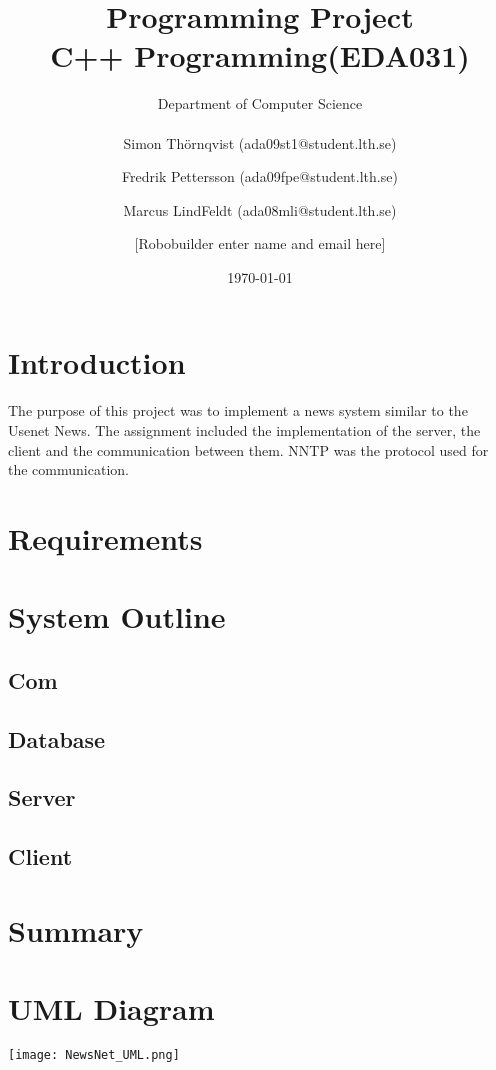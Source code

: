 \documentclass[a4paper, titlepage]{article}
\title{
    Programming Project \\
    C++ Programming(EDA031)
}
\author{
        Department of Computer Science \\
            \\
        Simon Thörnqvist (ada09st1@student.lth.se)
            \and
        Fredrik Pettersson (ada09fpe@student.lth.se)
            \and
        Marcus LindFeldt (ada08mli@student.lth.se)
            \and
        [Robobuilder enter name and email here]
}
\date{\today}
\begin{document}
\maketitle

\section{Introduction}\label{introduction}
The purpose of this project was to implement a news system similar to the Usenet News. The assignment included the implementation of the server, the client and the communication between them. NNTP was the protocol used for the communication.
 
\section{Requirements}\label{requirements}

\section{System Outline}\label{systemoutline}
\subsection{Com}

\subsection{Database}

\subsection{Server}

\subsection{Client}

\section{Summary}\label{summary}

\newpage
\appendix
\section{UML Diagram}\label{App:AppendixA}
\texttt{[image: NewsNet\_UML.png]}
\end{document}
